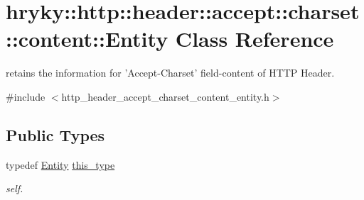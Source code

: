\hypertarget{classhryky_1_1http_1_1header_1_1accept_1_1charset_1_1content_1_1_entity}{\section{hryky\-:\-:http\-:\-:header\-:\-:accept\-:\-:charset\-:\-:content\-:\-:Entity Class Reference}
\label{classhryky_1_1http_1_1header_1_1accept_1_1charset_1_1content_1_1_entity}
}


retains the information for 'Accept-\/\-Charset' field-\/content of H\-T\-T\-P Header.  




{\ttfamily \#include $<$http\-\_\-header\-\_\-accept\-\_\-charset\-\_\-content\-\_\-entity.\-h$>$}

\subsection*{Public Types}
\begin{DoxyCompactItemize}
\item 
\hypertarget{classhryky_1_1http_1_1header_1_1accept_1_1charset_1_1content_1_1_entity_abec2a09e284292300258027416507d52}{typedef \hyperlink{classhryky_1_1http_1_1header_1_1accept_1_1charset_1_1content_1_1_entity}{Entity} \hyperlink{classhryky_1_1http_1_1header_1_1accept_1_1charset_1_1content_1_1_entity_abec2a09e284292300258027416507d52}{this\-\_\-type}}\label{classhryky_1_1http_1_1header_1_1accept_1_1charset_1_1content_1_1_entity_abec2a09e284292300258027416507d52}

\begin{DoxyCompactList}\small\item\em self. \end{DoxyCompactList}\end{DoxyCompactItemize}
